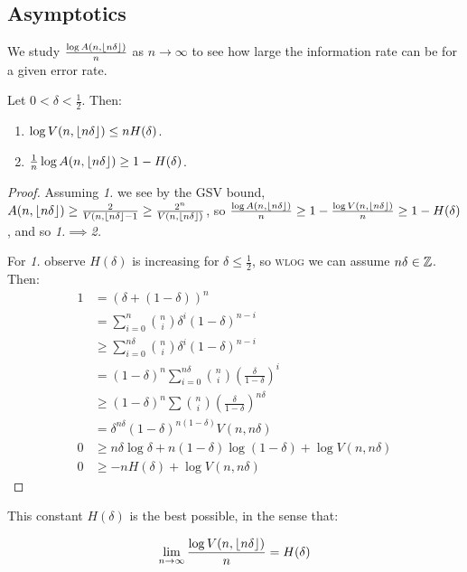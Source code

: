\documentclass[10pt,a4paper]{article}
\begin{document}
\subsection{Asymptotics}
We study $\frac{\log A(n, \lfloor n\delta \rfloor)}{n}$ as $n \to \infty$ to see how large the information rate can be for a given error rate.
\begin{proposition}
Let $0 < \delta < \frac12$. Then:
\begin{enumerate}
\item $\log V(n, \lfloor n \delta \rfloor) \leq n H(\delta)$.
\item $\frac1n \log A(n, \lfloor n\delta \rfloor) \geq 1- H(\delta)$.
\end{enumerate}
\end{proposition}
\begin{proof}
Assuming \textit{1.} we see by the GSV bound, $A(n, \lfloor n\delta \rfloor) \geq \frac{2}{V(n, \lfloor n\delta \rfloor-1} \geq \frac{2^n}{V(n, \lfloor n\delta \rfloor)}$, so $\frac{\log A(n, \lfloor n\delta \rfloor)}{n} \geq 1 - \frac{\log V(n, \lfloor n\delta \rfloor)}{n} \geq 1- H(\delta)$, and so \textit{1.}$\implies$\textit{2.}

For \textit{1.} observe $H(\delta)$ is increasing for $\delta \leq \frac12$, so \textsc{wlog} we can assume $n\delta \in \mathbb{Z}$. Then:
\begin{align*}
1 &= (\delta + (1-\delta))^n\\
&= \sum_{i=0}^n \binom{n}{i} \delta^i (1-\delta)^{n-i}\\
&\geq \sum_{i=0}^{n\delta} \binom{n}{i} \delta^i (1-\delta)^{n-i}\\
&= (1-\delta)^n \sum_{i=0}^{n\delta} \binom{n}{i} \left(\frac{\delta}{1-\delta}\right)^i\\
&\geq (1-\delta)^n \sum \binom{n}{i} \left(\frac{\delta}{1-\delta}\right)^{n\delta}\\
&= \delta^{n\delta}(1-\delta)^{n(1-\delta)}V(n,n\delta)\\
0 &\geq n\delta\log\delta + n(1-\delta)\log(1-\delta)+\log V(n,n\delta)\\
0 &\geq -nH(\delta) + \log V(n,n\delta)
\end{align*}
\end{proof}
This constant $H(\delta)$ is the best possible, in the sense that:
\begin{proposition}
\begin{align*}
\lim_{n\to\infty} \frac{\log V(n, \lfloor n\delta \rfloor)}{n} = H(\delta)
\end{align*}
\end{proposition}
\end{document}
